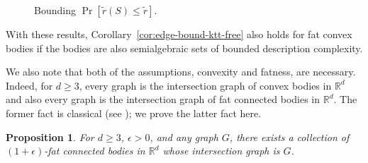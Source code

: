 \documentclass[11pt, reqno]{amsart}
\theoremstyle{plain}
\newtheorem{proposition}[theorem]{Proposition}
\theoremstyle{definition}
\theoremstyle{remark}
\numberwithin{theorem}{section}
\numberwithin{equation}{section}
\newcommand{\R}{\mathbb R}
\begin{document}
\begin{figure}
\centering
{}
\caption{\label{fig:expected-x3-size-fat-convex-boundary}
Bounding $\Pr[\tilde r(S)\leq \tilde r]$.}
\end{figure}


With these results, Corollary~\ref{cor:edge-bound-ktt-free} also holds for fat convex bodies if the bodies are also semialgebraic sets of bounded description complexity.

We also note that both of the assumptions, convexity and fatness, are necessary. Indeed, for $d\geq 3$, every graph is the intersection graph of convex bodies in $\R^d$ and also every graph is the intersection graph of fat connected bodies in $\R^d$. The former fact is classical (see \cite{Tie05}); we prove the latter fact here.

\begin{proposition}
\label{prop:any-graph-fat-non-convex}
For $d\geq 3$, $\epsilon>0$, and any graph $G$, there exists a collection of $(1+\epsilon)$-fat connected bodies in $\R^d$ whose intersection graph is $G$.
\end{proposition}
\end{document}
